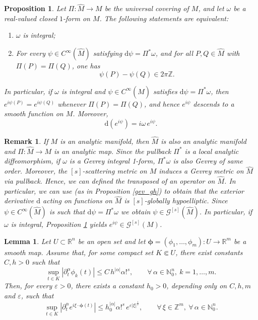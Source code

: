 \documentclass[11pt,reqno]{amsart}
\numberwithin{equation}{section}
\newtheorem{lemma}[theorem]{Lemma}
\newtheorem{proposition}[theorem]{Proposition}
\newtheorem{remark}{Remark}
\begin{document}
	\begin{proposition}\label{uni_cov}
		Let $\Pi:\hat M\to M$ be the universal covering of $M$, and let $\omega$ be a real-valued closed $1$-form on $M$. 
		The following statements are equivalent:
		\begin{enumerate}
			\item $\omega$ is integral;
			\item For every $\psi\in C^\infty(\hat{M})$ satisfying $\mathrm{d}\psi = \Pi^*\omega$, and for all $P,Q\in\hat{M}$ with $\Pi(P)=\Pi(Q)$, one has
			\[
			\psi(P)-\psi(Q)\in 2\pi\mathbb{Z}.
			\]
		\end{enumerate}
		In particular, if $\omega$ is integral and $\psi\in C^\infty(\hat M)$ satisfies $\mathrm{d}\psi=\Pi^*\omega$, then $e^{i\psi(P)} = e^{i\psi(Q)}$ whenever $\Pi(P)=\Pi(Q)$, and hence $e^{i\psi}$ descends to a smooth function on $M$. Moreover,
		\[
		\mathrm{d}(e^{i\psi}) = i\omega\, e^{i\psi}.
		\]
	\end{proposition}
	
	 
	\begin{remark}\label{hatM_analytic}
		If $M$ is an analytic manifold, then $\hat M$ is also an analytic manifold and $\Pi:\hat M\to M$ is an analytic map. Since the pullback $\Pi^*$ is a local analytic diffeomorphism, if $\omega$ is a Gevrey integral 1-form, $\Pi^{*}\omega$ is also Gevrey of same order. Moreover, the ${[s]}$-scattering metric on $M$ induces a Gevrey metric on $\hat M$ via pullback.  Hence, we can defined the transposed of an operator on $\hat M$. In particular, we can use \cite[Corollary 2.4]{CKMT} (as in Proposition \ref{gev_gh}) to obtain that the exterior derivative $\mathrm{d}$ acting on functions on $\hat M$ is $[s]$-globally hypoelliptic. Since $\psi\in C^\infty(\hat M)$ is such that $\mathrm{d}\psi=\Pi^*\omega$ we obtain $\psi\in\mathscr{G}^{[s]}(\hat M)$. In particular, if $\omega$ is integral, Proposition \ref{uni_cov} yields $e^{i\psi}\in\mathscr{G}^{[s]}(M)$.
	\end{remark}
	

	\begin{lemma}\label{lemma_ADL}
		Let $U\subset\mathbb{R}^n$ be an open set and let 
		$\boldsymbol{\phi}=(\phi_1,\dots,\phi_m):U\to\mathbb{R}^m$ 
		be a smooth map. 
		Assume that, for some compact set $K\Subset U$, there exist constants $C,h>0$ such that
		\[
		\sup_{t\in K} 	|\partial_t^\alpha \phi_k(t)| \le C\, h^{|\alpha|}\alpha!^s,
		\qquad 	\forall\, \alpha\in\mathbb{N}_0^n, \ k=1,\dots,m.
		\]
		Then, for every $\varepsilon>0$, there exists a constant $h_0>0$, depending only on $C,h,m$ and $\varepsilon$, such that
		\[
		\sup_{t\in K} |\partial_t^\alpha e^{i\xi\cdot\boldsymbol{\phi}(t)}| \le
		h_0^{|\alpha|}\alpha!^s \, e^{\varepsilon|\xi|^{\frac{1}{s}}}, \qquad
		\forall\,\xi\in\mathbb{Z}^m,\ \forall\,\alpha\in\mathbb{N}_0^n.
		\]
	\end{lemma}
	
\end{document}
